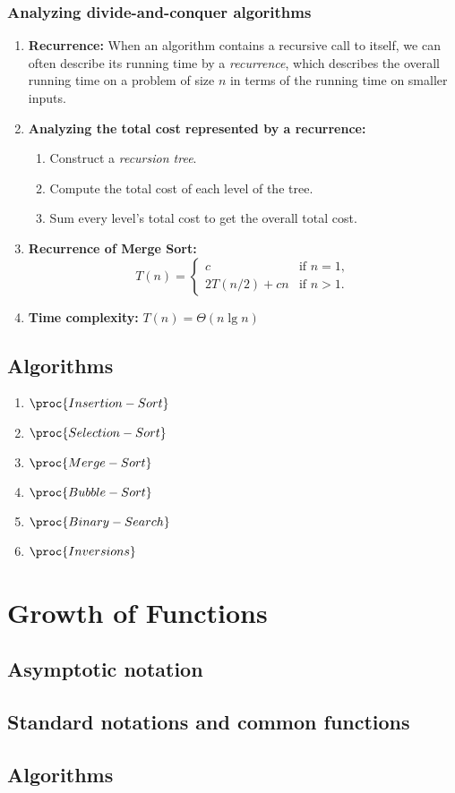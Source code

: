 \documentclass{report}
\begin{document}
\subsection{Analyzing divide-and-conquer algorithms}
\begin{enumerate}
    \item \textbf{Recurrence:} When an algorithm contains a recursive call to itself, we can often describe its running time by a \emph{recurrence}, which describes the overall running time on a problem of size $n$ in terms of the running time on smaller inputs.
    \item \textbf{Analyzing the total cost represented by a recurrence:}
    \begin{enumerate}
        \item Construct a \emph{recursion tree}.
        \item Compute the total cost of each level of the tree.
        \item Sum every level's total cost to get the overall total cost.
    \end{enumerate}
    \item \textbf{Recurrence of Merge Sort:} 
    $$
    T(n) = 
    \begin{cases}
        c            & \text{if } n = 1, \\
        2T(n/2) + cn & \text{if } n > 1.
    \end{cases}
    $$
    \item \textbf{Time complexity:} $T(n) = \Theta(n\lg{n})$
\end{enumerate}

\section{Algorithms}
\begin{enumerate}
    \item $\proc{Insertion-Sort}$
    \item $\proc{Selection-Sort}$
    \item $\proc{Merge-Sort}$
    \item $\proc{Bubble-Sort}$
    \item $\proc{Binary-Search}$
    \item $\proc{Inversions}$
\end{enumerate}

\chapter{Growth of Functions}
\section{Asymptotic notation}

\section{Standard notations and common functions}

\section{Algorithms}
\end{document}
